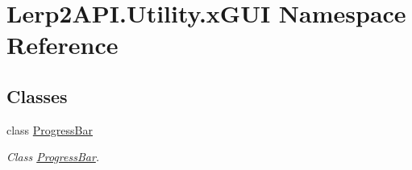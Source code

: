 \hypertarget{namespace_lerp2_a_p_i_1_1_utility_1_1x_g_u_i}{}\section{Lerp2\+A\+P\+I.\+Utility.\+x\+G\+UI Namespace Reference}
\label{namespace_lerp2_a_p_i_1_1_utility_1_1x_g_u_i}
\subsection*{Classes}
\begin{DoxyCompactItemize}
\item 
class \hyperlink{class_lerp2_a_p_i_1_1_utility_1_1x_g_u_i_1_1_progress_bar}{Progress\+Bar}
\begin{DoxyCompactList}\small\item\em Class \hyperlink{class_lerp2_a_p_i_1_1_utility_1_1x_g_u_i_1_1_progress_bar}{Progress\+Bar}. \end{DoxyCompactList}\end{DoxyCompactItemize}
